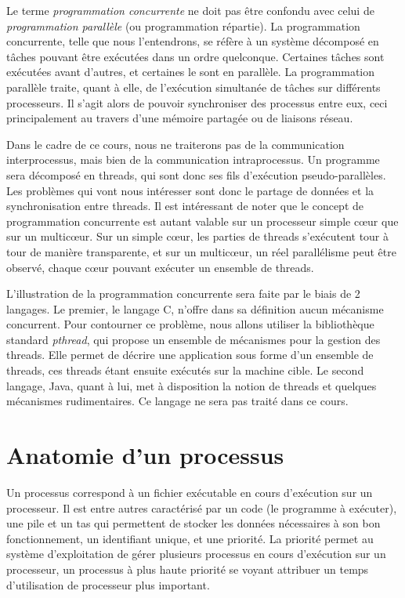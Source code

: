 Le terme \emph{programmation concurrente} ne doit pas être confondu avec celui de \emph{programmation parallèle} (ou programmation répartie). La programmation concurrente, telle que nous l'entendrons, se réfère à un système décomposé en tâches pouvant être exécutées dans un ordre quelconque. Certaines tâches sont exécutées avant d'autres, et certaines le sont en parallèle. La programmation parallèle traite, quant à elle, de l'exécution simultanée de tâches sur différents processeurs. Il s'agit alors de pouvoir synchroniser des processus entre eux, ceci principalement au travers d'une mémoire partagée ou de liaisons réseau.

Dans le cadre de ce cours, nous ne traiterons pas de la communication interprocessus, mais bien de la communication intraprocessus. Un programme sera décomposé en threads, qui sont donc ses fils d'exécution pseudo-parallèles. Les problèmes qui vont nous intéresser sont donc le partage de données et la synchronisation entre threads. Il est intéressant de noter que le concept de programmation concurrente est autant valable sur un processeur simple cœur que sur un multicœur. Sur un simple cœur, les parties de threads s'exécutent tour à tour de manière transparente, et sur un multicœur, un réel parallélisme peut être observé, chaque cœur pouvant exécuter un ensemble de threads.

L'illustration de la programmation concurrente sera faite par le biais de 2 langages. Le premier, le langage C, n'offre dans sa définition aucun mécanisme concurrent. Pour contourner ce problème, nous allons utiliser la bibliothèque standard \emph{pthread}, qui propose un ensemble de mécanismes pour la gestion des threads. Elle permet de décrire une application sous forme d'un ensemble de threads, ces threads étant ensuite exécutés sur la machine cible. Le second langage, Java, quant à lui, met à disposition la notion de threads et quelques mécanismes rudimentaires. Ce langage ne sera pas traité dans ce cours.

\section{Anatomie d'un processus}

Un processus correspond à un fichier exécutable en cours d'exécution sur un processeur. Il est entre autres caractérisé par un code (le programme à exécuter), une pile et un tas qui permettent de stocker les données nécessaires à son bon fonctionnement, un identifiant unique, et une priorité. La priorité permet au système d'exploitation de gérer plusieurs processus en cours d'exécution sur un processeur, un processus à plus haute priorité se voyant attribuer un temps d'utilisation de processeur plus important.

